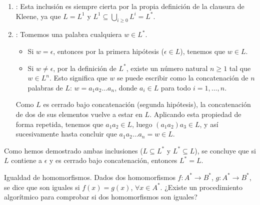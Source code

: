 \documentclass[12pt]{book} %
\begin{document}
\begin{solucion}
\begin{enumerate}
    \item {}: Esta inclusión es siempre cierta por la propia definición de la clausura de Kleene, ya que $L = L^1$ y $L^1 \subseteq \bigcup_{i \ge 0} L^i = L^*$.

    \item {}: Tomemos una palabra cualquiera $w \in L^*$.
    \begin{itemize}
        \item Si $w = \epsilon$, entonces por la primera hipótesis ($\epsilon \in L$), tenemos que $w \in L$.
        \item Si $w \neq \epsilon$, por la definición de $L^*$, existe un número natural $n \geq 1$ tal que $w \in L^n$. Esto significa que $w$ se puede escribir como la concatenación de $n$ palabras de $L$: $w = a_1 a_2 \dots a_n$, donde $a_i \in L$ para todo $i = 1, \dots, n$.
    \end{itemize}
    Como $L$ es cerrado bajo concatenación (segunda hipótesis), la concatenación de dos de sus elementos vuelve a estar en $L$. Aplicando esta propiedad de forma repetida, tenemos que $a_1 a_2 \in L$, luego $(a_1 a_2) a_3 \in L$, y así sucesivamente hasta concluir que $a_1 a_2 \dots a_n = w \in L$.
\end{enumerate}
Como hemos demostrado ambas inclusiones ($L \subseteq L^*$ y $L^* \subseteq L$), se concluye que si $L$ contiene a $\epsilon$ y es cerrado bajo concatenación, entonces $L^* = L$.

\end{solucion}

\begin{ejercicio}
Igualdad de homomorfismos. Dados dos homomorfismos $f : A^* \to B^*$, $g : A^* \to B^*$, se dice que son iguales si $f(x) = g(x)$, $\forall x \in A^*$. ¿Existe un procedimiento algorítmico para comprobar si dos homomorfismos son iguales?
\end{ejercicio}
\end{document}
